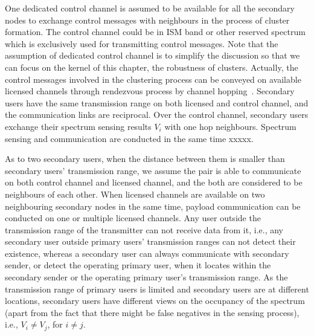 \documentclass[journal,comsoc]{IEEEtran}
\theoremstyle{mytheoremstyle}
\theoremstyle{mytheoremstyle}
\theoremstyle{mytheoremstyle}
\newcommand{\ie}{i.e., }
\begin{document}
One dedicated control channel is assumed to be available for all the secondary nodes to exchange control messages with neighbours in the process of cluster formation.
The control channel could be in ISM band or other reserved spectrum which is exclusively used for transmitting control messages.
Note that the assumption of dedicated control channel is to simplify the discussion so that we can focus on the kernel of this chapter, the robustness of clusters.
Actually, the control messages involved in the clustering process can be conveyed on available licensed channels through rendezvous process by channel hopping~\cite{channelHopping_Rendezvous_2014, Gu_distributed_rendezvous_2014}. 
Secondary users have the same transmission range on both licensed and control channel, and the communication links are reciprocal.
Over the control channel, secondary users exchange their spectrum sensing results $V_{i}$ with one hop neighbours. 
Spectrum sensing and communication are conducted in the same time xxxxx.

As to two secondary users, when the distance between them is smaller than secondary users' transmission range, we assume the pair is able to communicate on both control channel and licensed channel, and the both are considered to be neighbours of each other.
When licensed channels are available on two neighbouring secondary nodes in the same time, payload communication can be conducted on one or multiple licensed channels.
Any user outside the transmission range of the transmitter can not receive data from it, \ie  any secondary user outside primary users' transmission ranges can not detect their existence, whereas a secondary user can always communicate with secondary sender, or detect the operating primary user, when it locates within the secondary sender or the operating primary user's transmission range.
As the transmission range of primary users is limited and secondary users are at different locations, secondary users have different views on the occupancy of the spectrum (apart from the fact that there might be false negatives in the sensing process), i.e., $V_i \neq V_j$, for $i \neq j$.
\end{document}
